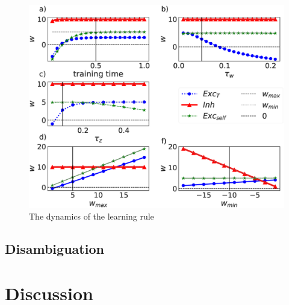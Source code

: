 \documentclass{esannV2}
\begin{document}
\begin{figure}[h!]
\centering
\includegraphics[scale=0.3]{training_rule_quantities_pre_rule_False.eps}
\caption{The dynamics of the learning rule}\label{Fig:learning_quantities_post}
\end{figure}

 
\subsection{Disambiguation}


\section{Discussion}



\begin{footnotesize}





\end{footnotesize}

\end{document}
